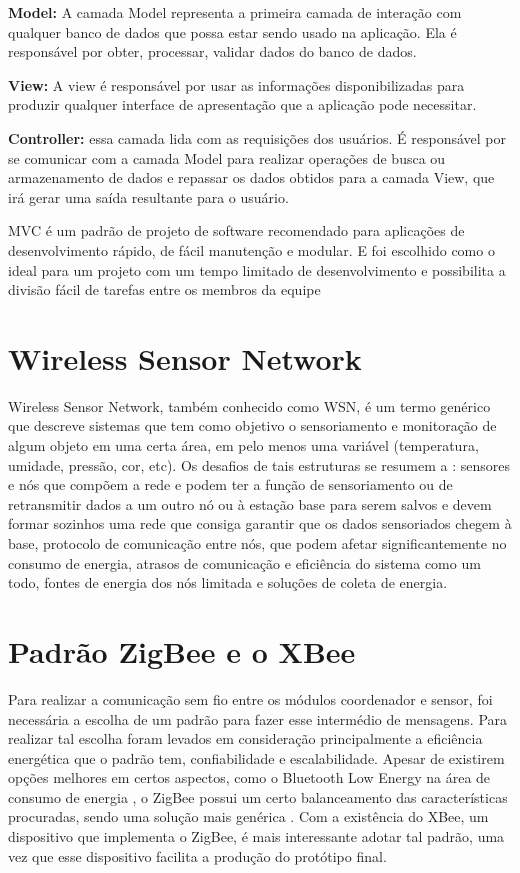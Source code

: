 \textbf{Model:} A camada Model representa a primeira camada de interação com qualquer banco de dados que possa estar sendo usado na aplicação. Ela é responsável por obter, processar, validar dados do banco de dados.

\textbf{View:} A view é responsável por usar as informações disponibilizadas para produzir qualquer interface de apresentação que a aplicação pode necessitar.

\textbf{Controller:} essa camada lida com as requisições dos usuários. É responsável por se comunicar com a camada Model para realizar operações de busca ou armazenamento de dados e repassar os dados obtidos para a camada View, que irá gerar uma saída resultante para o usuário.

MVC é um padrão de projeto de software recomendado para aplicações de desenvolvimento rápido, de fácil manutenção e modular. E foi escolhido como o ideal para um projeto com um tempo limitado de desenvolvimento e possibilita a divisão fácil de tarefas entre os membros da equipe

\section{Wireless Sensor Network }
\label{Sec:WSN}
Wireless Sensor Network, também conhecido como WSN, é um termo genérico que descreve sistemas que tem como objetivo o sensoriamento e monitoração de algum objeto em uma certa área, em pelo menos uma variável (temperatura, umidade, pressão, cor, etc). Os desafios de tais estruturas se resumem a \cite{WSN_survey_JYBMDG_article}: sensores e nós que compõem a rede e podem ter a função de sensoriamento ou de retransmitir dados a um outro nó ou à estação base para serem salvos e devem formar sozinhos uma rede que consiga garantir que os dados sensoriados chegem à base, protocolo de comunicação entre nós, que podem afetar significantemente no consumo de energia, atrasos de comunicação e eficiência do sistema como um todo, fontes de energia dos nós limitada e soluções de coleta de energia. 

\section{Padrão ZigBee e o XBee}
\label{Sec:ZigBee_XBee}
 Para realizar a comunicação sem fio entre os módulos coordenador e sensor, foi necessária a escolha de um padrão para fazer esse intermédio de mensagens. Para realizar tal escolha foram levados em consideração principalmente a eficiência energética que o padrão tem, confiabilidade e escalabilidade. Apesar de existirem opções melhores em certos aspectos, como o Bluetooth Low Energy na área de consumo de energia \cite{BLE_MHABAL}, o ZigBee possui um certo balanceamento das características procuradas, sendo uma solução mais genérica \cite{CG_JP_survey}. Com a existência do XBee, um dispositivo que implementa o ZigBee, é mais interessante adotar tal padrão, uma vez que esse dispositivo facilita a produção do protótipo final.

